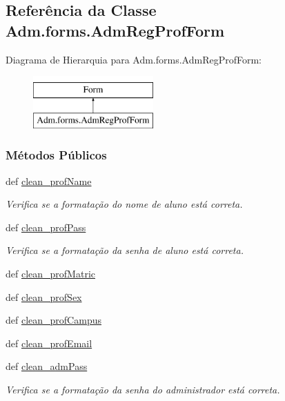 \hypertarget{classAdm_1_1forms_1_1AdmRegProfForm}{\subsection{Referência da Classe Adm.\-forms.\-Adm\-Reg\-Prof\-Form}
\label{classAdm_1_1forms_1_1AdmRegProfForm}
}
Diagrama de Hierarquia para Adm.\-forms.\-Adm\-Reg\-Prof\-Form\-:\begin{figure}[H]
\begin{center}
\leavevmode
\includegraphics[height=2.000000cm]{d3/d88/classAdm_1_1forms_1_1AdmRegProfForm}
\end{center}
\end{figure}
\subsubsection*{Métodos Públicos}
\begin{DoxyCompactItemize}
\item 
def \hyperlink{classAdm_1_1forms_1_1AdmRegProfForm_a26bfe5f304a419a438bbfd35b6d9f891}{clean\-\_\-prof\-Name}
\begin{DoxyCompactList}\small\item\em Verifica se a formatação do nome de aluno está correta. \end{DoxyCompactList}\item 
def \hyperlink{classAdm_1_1forms_1_1AdmRegProfForm_a76ad8b959e07cd987f0a3f491bc58fcf}{clean\-\_\-prof\-Pass}
\begin{DoxyCompactList}\small\item\em Verifica se a formatação da senha de aluno está correta. \end{DoxyCompactList}\item 
def \hyperlink{classAdm_1_1forms_1_1AdmRegProfForm_ac304be31b6186493cef0b108886a060c}{clean\-\_\-prof\-Matric}
\item 
def \hyperlink{classAdm_1_1forms_1_1AdmRegProfForm_a1586abd52a95f448af23eee2f469cbef}{clean\-\_\-prof\-Sex}
\item 
def \hyperlink{classAdm_1_1forms_1_1AdmRegProfForm_aabf2b7b7b871421e93324228b870ec8a}{clean\-\_\-prof\-Campus}
\item 
def \hyperlink{classAdm_1_1forms_1_1AdmRegProfForm_aa74cf0e5d495b7d7a39d91100bd29278}{clean\-\_\-prof\-Email}
\item 
def \hyperlink{classAdm_1_1forms_1_1AdmRegProfForm_a1d6ca5be033cd0e18f23124370b4dc3a}{clean\-\_\-adm\-Pass}
\begin{DoxyCompactList}\small\item\em Verifica se a formatação da senha do administrador está correta. \end{DoxyCompactList}\end{DoxyCompactItemize}
